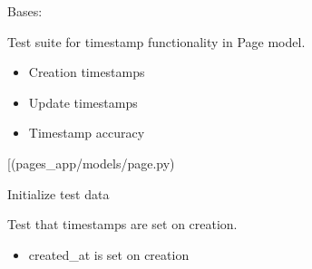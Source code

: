 \documentclass[letterpaper,10pt,english]{sphinxmanual}
\begin{document}
\begin{fulllineitems}
\label{\detokenize{pages_app.tests:pages_app.tests.test_models.TimestampedModelTest}}
\pysigstartsignatures
\pysiglinewithargsret
{}
{}
{}
\pysigstopsignatures
\sphinxAtStartPar
Bases: 

\sphinxAtStartPar
Test suite for timestamp functionality in Page model.
\begin{description}
\begin{itemize}
\item {} 
\sphinxAtStartPar
Creation timestamps

\item {} 
\sphinxAtStartPar
Update timestamps

\item {} 
\sphinxAtStartPar
Timestamp accuracy

\end{itemize}

\sphinxAtStartPar
{[}\sphinxtitleref{Page}{]}(pages\_app/models/page.py)

\end{description}

\begin{fulllineitems}
\label{\detokenize{pages_app.tests:pages_app.tests.test_models.TimestampedModelTest.setUp}}
\pysigstartsignatures
\pysiglinewithargsret
{}
{}
{}
\pysigstopsignatures
\sphinxAtStartPar
Initialize test data

\end{fulllineitems}


\begin{fulllineitems}
\label{\detokenize{pages_app.tests:pages_app.tests.test_models.TimestampedModelTest.test_timestamps_creation}}
\pysigstartsignatures
\pysiglinewithargsret
{}
{}
{}
\pysigstopsignatures
\sphinxAtStartPar
Test that timestamps are set on creation.
\begin{description}
\begin{itemize}
\item {} 
\sphinxAtStartPar
created\_at is set on creation


\end{itemize}
\end{description}
\end{fulllineitems}
\end{fulllineitems}
\end{document}
